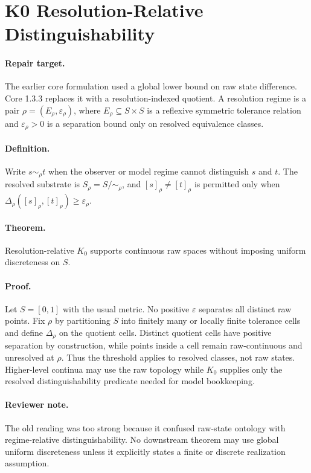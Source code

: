
\section{K0 Resolution-Relative Distinguishability}
\label{app:oc133-k0-resolution}

\paragraph{Repair target.}
The earlier core formulation used a global lower bound on raw state difference.  Core 1.3.3
replaces it with a resolution-indexed quotient.  A resolution regime is a pair
\(\rho=(E_\rho,\varepsilon_\rho)\), where \(E_\rho\subseteq S\times S\) is a
reflexive symmetric tolerance relation and \(\varepsilon_\rho>0\) is a
separation bound only on resolved equivalence classes.

\paragraph{Definition.}
Write \(s\sim_\rho t\) when the observer or model regime cannot distinguish
\(s\) and \(t\).  The resolved substrate is \(S_\rho=S/{\sim_\rho}\), and
\([s]_\rho\neq[t]_\rho\) is permitted only when
\(\Delta_\rho([s]_\rho,[t]_\rho)\ge\varepsilon_\rho\).

\paragraph{Theorem.}
Resolution-relative \(K_0\) supports continuous raw spaces without imposing
uniform discreteness on \(S\).

\paragraph{Proof.}
Let \(S=[0,1]\) with the usual metric.  No positive \(\varepsilon\) separates
all distinct raw points.  Fix \(\rho\) by partitioning \(S\) into finitely many
or locally finite tolerance cells and define \(\Delta_\rho\) on the quotient
cells.  Distinct quotient cells have positive separation by construction, while
points inside a cell remain raw-continuous and unresolved at \(\rho\).  Thus the
threshold applies to resolved classes, not raw states.  Higher-level continua
may use the raw topology while \(K_0\) supplies only the resolved
distinguishability predicate needed for model bookkeeping.

\paragraph{Reviewer note.}
The old reading was too strong because it confused raw-state ontology with
regime-relative distinguishability.  No downstream theorem may use global
uniform discreteness unless it explicitly states a finite or discrete
realization assumption.
